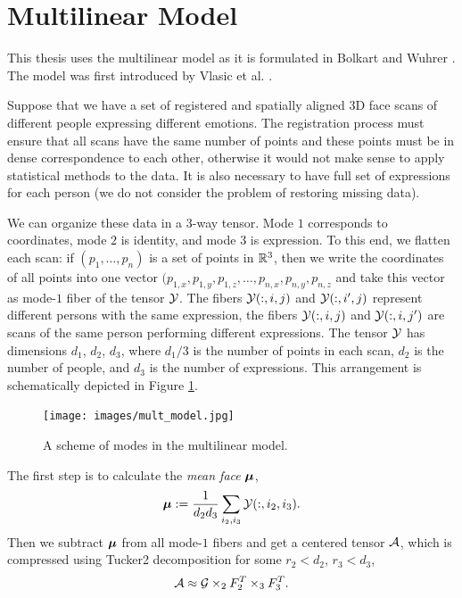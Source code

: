 \section{Multilinear Model}
\label{mult_model}

This thesis uses the multilinear model as it is formulated in Bolkart and Wuhrer \cite{bolkart_wuhrer_2013}. The model was first introduced by Vlasic et al. \cite{vlasic}.



Suppose that we have a set of registered and spatially aligned 3D face scans of different people expressing different emotions.
The registration process must ensure that all scans have the same number of points
and these points must be in dense correspondence to each other, otherwise
it would not make sense to apply statistical methods
to the data. It is also necessary to have full set of expressions for each 
person (we do not consider the problem of restoring missing data).



We can organize these data in a $3$-way tensor. Mode $1$ corresponds
to coordinates, mode $2$ is identity, and mode $3$ is expression.
To this end, we flatten each scan: if $(p_1, \dots, p_n)$ is a set of points in $\mathbb{R}^3$, then we write
the coordinates of all points into one vector $(p_{1, x}, p_{1, y}, p_{1, z}, \dots, p_{n, x}, p_{n, y}, p_{n, z}$
and take this vector as mode-$1$ fiber of the tensor $\mathcal{Y}$. The fibers $\mathcal{Y}(:, i, j)$
and $\mathcal{Y}(:, i', j)$ represent different persons with the same expression, the fibers
$\mathcal{Y}(:, i, j)$ and $\mathcal{Y}(:, i, j')$ are scans of the same person performing different expressions. 
The tensor $\mathcal{Y}$ has dimensions $d_1$, $d_2$, $d_3$, where $d_1 / 3$ is the number
of points in each scan, $d_2$ is the number of people, and $d_3$ is the number
of expressions. This arrangement is schematically depicted in Figure \ref{fig:img_mult_model}.



\begin{figure}[t!]
\centering
        \texttt{[image: images/mult\_model.jpg]}
    \caption{A scheme of modes in the multilinear model.}
    \label{fig:img_mult_model}
\end{figure}

The first step is to calculate the \textit{mean face} ${\boldsymbol{\mu}}$,
\begin{equation}
    {\boldsymbol{\mu}} := \frac{1}{d_2 d_3} \sum_{i_2, i_3} \mathcal{Y}(:, i_2, i_3).
\end{equation}
Then we subtract ${\boldsymbol{\mu}}$ from all mode-$1$ fibers and get a centered tensor $\mathcal{A}$, 
which is compressed using Tucker2 decomposition for some $r_2 < d_2$, $r_3 < d_3$,
\begin{equation}
    \mathcal{A} \approx \mathcal{G} \times_2 F_2^T \times_3 F_3^T.
\end{equation}



